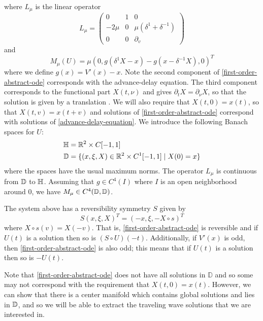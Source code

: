 where \(L_\mu\) is the linear operator %
\begin{equation*}
	L_\mu = \begin{pmatrix}
		0 & 1 & 0\\
		-2\mu & 0 & \mu(\delta^1 + \delta^{-1}) \\
		0 & 0 & \partial_v
	\end{pmatrix}
\end{equation*}
and 
\begin{equation*}
	M_\mu(U) = \mu (0, g(\delta^1X -x) - g(x- \delta^{-1} X), 0)^T
\end{equation*}
where we define \(g(x)= V'(x) - x\). Note the second component of \cref{first-order-abstract-ode} corresponds with the advance-delay equation. The third component corresponds to the functional part  \(X(t,\nu)\) and gives \(\partial_t X = \partial_\nu X\), so that the solution is given by a translation . We will also require that \(X(t,0) = x(t)\), so that \(X(t,v) = x(t+v)\) and solutions of \cref{first-order-abstract-ode} correspond with solutions of \cref{advance-delay-equation}. We introduce the following Banach spaces for \(U\):
\begin{equation*}
	\begin{aligned}
		\mathbb{H} &= \mathbb{R}^2 \times C[-1,1] \\
		\mathbb{D} &= \{(x, \xi, X) \in \mathbb{R}^2 \times C^1[-1,1] \mid X(0) = x\}
	\end{aligned}
\end{equation*}
where the spaces have the usual maximum norms. The operator \(L_\mu\) is continuous from \(\mathbb{D}\) to \(\mathbb{H}\). Assuming that \(g\in C^4(I)\) where \(I\) is an open neighborhood around \(0\), we have \(M_\mu \in C^4(\mathbb{D},\mathbb{D})\).

The system above has a reversibility symmetry \(S\) given by 
\begin{equation*}
	S(x, \xi, X)^T = (-x, \xi, -X \circ s)^T
\end{equation*}
where \(X\circ s (v) = X(-v)\). That is, \cref{first-order-abstract-ode} is reversible and if \(U(t)\) is a solution then so is \((S\circ U)(-t)\). Additionally, if \(V'(x)\) is odd, then \cref{first-order-abstract-ode} is also odd; this means that if \(U(t)\) is a solution then so is \(-U(t)\).

Note that \cref{first-order-abstract-ode} does not have all solutions in \(\mathbb D\) and so some may not correspond with the requirement that \(X(t,0) = x(t)\). However, we can show that there is a center manifold which contains global solutions and lies in \(\mathbb{D}\), and so we will be able to extract the traveling wave solutions that we are interested in.

